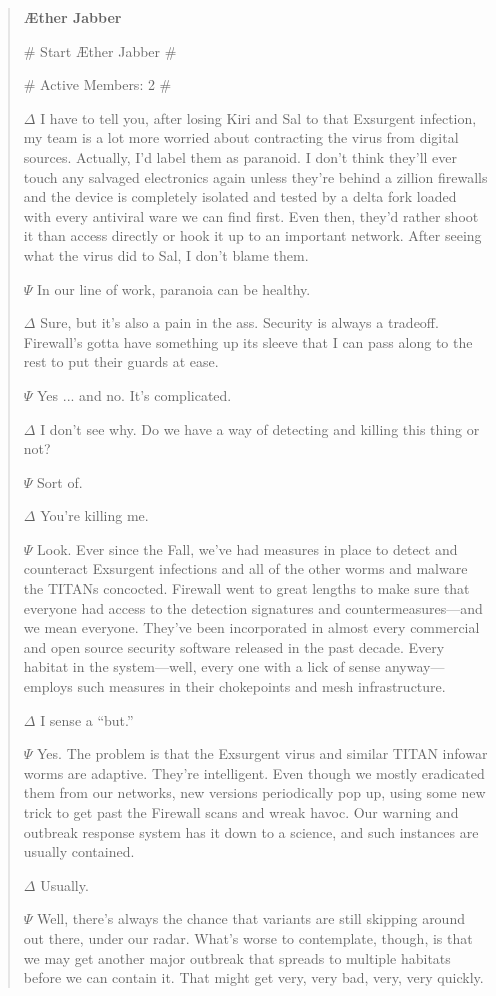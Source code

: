 \begin{quotation}
\textbf{Æther Jabber}

\# Start Æther Jabber \#

\# Active Members: 2 \#

$\Delta$ I have to tell you, after losing Kiri and Sal to that Exsurgent
infection, my team is a lot more worried about contracting the
virus from digital sources. Actually, I’d label them as paranoid.
I don’t think they’ll ever touch any salvaged electronics again
unless they’re behind a zillion firewalls and the device is completely
isolated and tested by a delta fork loaded with every
antiviral ware we can find first. Even then, they’d rather shoot it
than access directly or hook it up to an important network. After
seeing what the virus did to Sal, I don’t blame them.

$\Psi$ In our line of work, paranoia can be healthy.

$\Delta$ Sure, but it’s also a pain in the ass. Security is always a tradeoff.
Firewall’s gotta have something up its sleeve that I can pass
along to the rest to put their guards at ease.

$\Psi$ Yes ... and no. It’s complicated.

$\Delta$ I don’t see why. Do we have a way of detecting and killing this
thing or not?

$\Psi$ Sort of.

$\Delta$ You’re killing me.

$\Psi$ Look. Ever since the Fall, we’ve had measures in place to
detect and counteract Exsurgent infections and all of the other
worms and malware the TITANs concocted. Firewall went to
great lengths to make sure that everyone had access to the
detection signatures and countermeasures—and we mean everyone.
They’ve been incorporated in almost every commercial
and open source security software released in the past decade.
Every habitat in the system—well, every one with a lick of
sense anyway—employs such measures in their chokepoints
and mesh infrastructure.

$\Delta$ I sense a “but.”

$\Psi$ Yes. The problem is that the Exsurgent virus and similar TITAN
infowar worms are adaptive. They’re intelligent. Even though
we mostly eradicated them from our networks, new versions
periodically pop up, using some new trick to get past the
Firewall scans and wreak havoc. Our warning and outbreak
response system has it down to a science, and such instances
are usually contained.

$\Delta$ Usually.

$\Psi$ Well, there’s always the chance that variants are still skipping
around out there, under our radar. What’s worse to contemplate,
though, is that we may get another major outbreak that spreads
to multiple habitats before we can contain it. That might get
very, very bad, very, very quickly.
\end{quotation}


